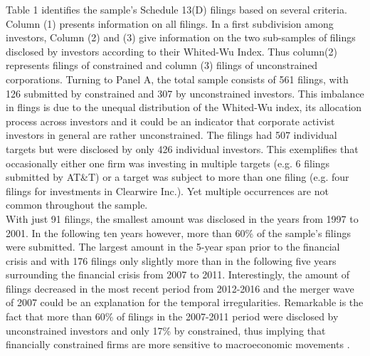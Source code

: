 \documentclass[12pt]{article}
\begin{document}
Table 1 identifies the sample's Schedule 13(D) filings based on several criteria. Column (1) presents information on all filings. In a first subdivision among investors, Column (2) and (3) give information on the two sub-samples of filings disclosed by investors according to their Whited-Wu Index. Thus column(2) represents filings of constrained and column (3) filings of unconstrained corporations.
Turning to Panel A, the total sample consists of 561 filings, with 126 submitted by constrained and 307 by unconstrained investors. This imbalance in flings is due to the unequal distribution of the Whited-Wu index, its allocation process across investors and it could be an indicator that corporate activist investors in general are rather unconstrained.
%
The filings had 507 individual targets but were disclosed by only 426 individual investors. This exemplifies that occasionally either one firm was investing in multiple targets (e.g. 6 filings submitted by AT\&T) or a target was subject to more than one filing (e.g. four filings for investments in Clearwire Inc.). Yet multiple occurrences are not common throughout the sample.\\
With just 91 filings, the smallest amount was disclosed in the years from 1997 to 2001. In the following ten years however, more than 60\% of the sample's filings were submitted. The largest amount in the 5-year span prior to the financial crisis and with 176 filings only slightly more than in the following five years surrounding the financial crisis from 2007 to 2011. Interestingly, the amount of filings decreased in the most recent period from 2012-2016 and the merger wave of 2007 \citep[p.19]{Huang2017} could be an explanation for the temporal irregularities. Remarkable is the fact that more than 60\% of filings in the 2007-2011 period were disclosed by unconstrained investors and only 17\% by constrained, thus implying that financially constrained firms are more sensitive to macroeconomic movements \citep[p.1197]{Campello2006}.
\end{document}
